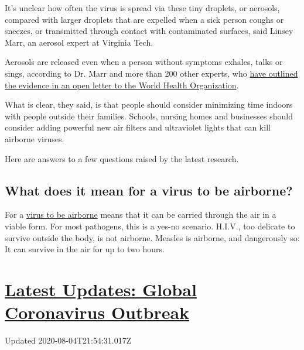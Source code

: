 It's unclear how often the virus is spread via these tiny droplets, or
aerosols, compared with larger droplets that are expelled when a sick
person coughs or sneezes, or transmitted through contact with
contaminated surfaces, said Linsey Marr, an aerosol expert at Virginia
Tech.

Aerosols are released even when a person without symptoms exhales, talks
or sings, according to Dr. Marr and more than 200 other experts, who
\href{https://academic.oup.com/cid/article/doi/10.1093/cid/ciaa939/5867798}{have
outlined the evidence in an open letter to the World Health
Organization}.

What is clear, they said, is that people should consider minimizing time
indoors with people outside their families. Schools, nursing homes and
businesses should consider adding powerful new air filters and
ultraviolet lights that can kill airborne viruses.

Here are answers to a few questions raised by the latest research.

\hypertarget{what-does-it-mean-for-a-virus-to-be-airborne}{%
\subsection{What does it mean for a virus to be
airborne?}\label{what-does-it-mean-for-a-virus-to-be-airborne}}

For a
\href{https://www.nytimes3xbfgragh.onion/2020/07/09/health/virus-aerosols-who.html}{virus
to be airborne} means that it can be carried through the air in a viable
form. For most pathogens, this is a yes-no scenario. H.I.V., too
delicate to survive outside the body, is not airborne. Measles is
airborne, and dangerously so: It can survive in the air for up to two
hours.

\hypertarget{latest-updates-global-coronavirus-outbreak}{%
\section{\texorpdfstring{\href{https://www.nytimes3xbfgragh.onion/2020/08/04/world/coronavirus-cases.html?action=click\&pgtype=Article\&state=default\&region=MAIN_CONTENT_1\&context=storylines_live_updates}{Latest
Updates: Global Coronavirus
Outbreak}}{Latest Updates: Global Coronavirus Outbreak}}\label{latest-updates-global-coronavirus-outbreak}}

Updated 2020-08-04T21:54:31.017Z

